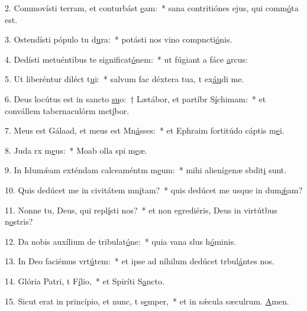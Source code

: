 2. Commovísti terram, et conturbást \uline{e}am:~* sana contritiónes ejus, qui comm\uline{ó}ta est.\par 
3. Ostendísti pópulo tu d\uline{u}ra:~* potásti nos vino compncti\uline{ó}nis.\par 
4. Dedísti metuéntibus te significat\uline{ó}nem:~* ut fúgiant a fáce \uline{a}rcus:\par 
5. Ut liberéntur diléct t\uline{u}i:~* salvum fac déxtera tua, t ex\uline{áu}di me.\par 
6. Deus locútus est in sancto \uline{su}o:~† Lætábor, et partíbr S\uline{í}chimam:~* et convállem tabernaculórm met\uline{í}bor.\par 
7. Meus est Gálaad, et meus est Mn\uline{á}sses:~* et Ephraim fortitúdo cáptis m\uline{e}i.\par 
8. Juda rx m\uline{e}us:~* Moab olla spi m\uline{e}æ.\par 
9. In Idumǽam exténdam calceaméntm m\uline{e}um:~* mihi alienígenæ sbdit\uline{i} sunt.\par 
10. Quis dedúcet me in civitátem mn\uline{í}tam?~* quis dedúcet me usque in dum\uline{ǽ}am?\par 
11. Nonne tu, Deus, qui repl\uline{í}sti nos?~* et non egrediéris, Deus in virtútbus n\uline{o}stris?\par 
12. Da nobis auxílium de tribulat\uline{ó}ne:~* quia vana slus h\uline{ó}minis.\par 
13. In Deo faciémus vrt\uline{ú}tem:~* et ipse ad níhilum dedúcet trbul\uline{á}ntes nos.\par 
14. Glória Patri, t F\uline{í}lio,~* et Spiríti S\uline{a}ncto.\par 
15. Sicut erat in princípio, et nunc, t s\uline{e}mper,~* et in sǽcula sæculrum. \uline{A}men.\par 
